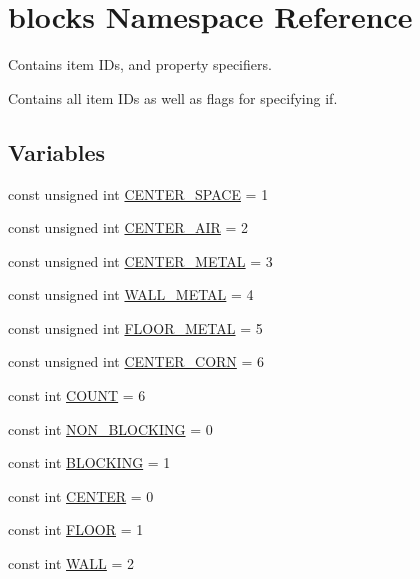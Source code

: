 \hypertarget{namespaceblocks}{\section{blocks Namespace Reference}
\label{namespaceblocks}
}


Contains item I\-Ds, and property specifiers.

Contains all item I\-Ds as well as flags for specifying if.  


\subsection*{Variables}
\begin{DoxyCompactItemize}
\item 
const unsigned int \hyperlink{namespaceblocks_a737c0542023b22bab8672250922590e6}{C\-E\-N\-T\-E\-R\-\_\-\-S\-P\-A\-C\-E} = 1
\item 
const unsigned int \hyperlink{namespaceblocks_a3327185e4957b8756fcd8b0aeae2cbcb}{C\-E\-N\-T\-E\-R\-\_\-\-A\-I\-R} = 2
\item 
const unsigned int \hyperlink{namespaceblocks_a32435f4674386fdba12f33155aea4310}{C\-E\-N\-T\-E\-R\-\_\-\-M\-E\-T\-A\-L} = 3
\item 
const unsigned int \hyperlink{namespaceblocks_a443c0848965126c5e669c5e88fd44426}{W\-A\-L\-L\-\_\-\-M\-E\-T\-A\-L} = 4
\item 
const unsigned int \hyperlink{namespaceblocks_a0b0352a68a2e1ee22c3fd2e94181d15d}{F\-L\-O\-O\-R\-\_\-\-M\-E\-T\-A\-L} = 5
\item 
const unsigned int \hyperlink{namespaceblocks_a447728bb17162a7d87ed06d4db11060a}{C\-E\-N\-T\-E\-R\-\_\-\-C\-O\-R\-N} = 6
\item 
const int \hyperlink{namespaceblocks_aea8b288e0f2f0df691ade96adb6f0833}{C\-O\-U\-N\-T} = 6
\item 
const int \hyperlink{namespaceblocks_a0493803a45dd00ed11cc9be729da4317}{N\-O\-N\-\_\-\-B\-L\-O\-C\-K\-I\-N\-G} = 0
\item 
const int \hyperlink{namespaceblocks_a12de5833d1f76be099d7371038e239cd}{B\-L\-O\-C\-K\-I\-N\-G} = 1
\item 
const int \hyperlink{namespaceblocks_a293bbaa7ca5f1014dc69c2caaa414095}{C\-E\-N\-T\-E\-R} = 0
\item 
const int \hyperlink{namespaceblocks_af99b22467101d71649b471215cc001fb}{F\-L\-O\-O\-R} = 1
\item 
const int \hyperlink{namespaceblocks_abc4e6acf8b46e7e8ef24cdc3e4f2a744}{W\-A\-L\-L} = 2

\end{DoxyCompactItemize}
